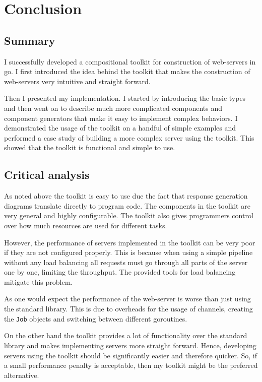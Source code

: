 \section{Conclusion}
\label{sec:conclusion}
\subsection{Summary}
I successfully developed a compositional toolkit for construction of 
web-servers in go. I first introduced the idea behind the toolkit that 
makes the construction of web-servers very intuitive and straight forward. 

Then I presented my implementation. I started by introducing the basic types
and then went on to describe much more complicated components and component generators
that make it easy to implement complex behaviors. I demonstrated the usage of the 
toolkit on a handful of simple examples and performed a case study of building
a more complex server using the toolkit. This showed that the toolkit is
functional and simple to use. 


\subsection{Critical analysis}
As noted above the toolkit is easy to use due the fact that response 
generation diagrams translate directly to program code. The components
in the toolkit are very general and highly configurable. The toolkit
also gives programmers control over how much resources are used for 
different tasks. 

However, the performance of servers implemented in the toolkit can be 
very poor if they are not configured properly. This is because when using a simple
pipeline without any load balancing all requests must go through all parts
of the server one by one, limiting the throughput. The provided
tools for load balancing mitigate this problem.

As one would expect the performance of the web-server
is worse than just using the standard library. This is due to overheads
for the usage of channels, creating the \texttt{Job} objects
and switching between different goroutines.

On the other hand the toolkit provides a lot of functionality over the
standard library and makes implementing servers more straight forward. 
Hence, developing servers using the toolkit should be
significantly easier and therefore quicker. So, if a small performance
penalty is acceptable, then my toolkit might be the preferred alternative.

